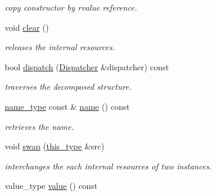 \begin{DoxyCompactItemize}
\begin{DoxyCompactList}\small\item\em copy constructor by rvalue reference. \end{DoxyCompactList}\item 
\hypertarget{classhryky_1_1reduction_1_1_bool_ac5ecbeeaf7a08b030db1465f3d101f25}{void \hyperlink{classhryky_1_1reduction_1_1_bool_ac5ecbeeaf7a08b030db1465f3d101f25}{clear} ()}\label{classhryky_1_1reduction_1_1_bool_ac5ecbeeaf7a08b030db1465f3d101f25}

\begin{DoxyCompactList}\small\item\em releases the internal resources. \end{DoxyCompactList}\item 
bool \hyperlink{classhryky_1_1reduction_1_1_base_a71b31d4d0ed915254e2cb1ef217f28c4}{dispatch} (\hyperlink{classhryky_1_1reduction_1_1_dispatcher}{Dispatcher} \&dispatcher) const 
\begin{DoxyCompactList}\small\item\em traverses the decomposed structure. \end{DoxyCompactList}\item 
\hypertarget{classhryky_1_1reduction_1_1_base_a842569265d741905eb8a353d3935f1d1}{\hyperlink{namespacehryky_1_1reduction_ac686c30a4c8d196bbd0f05629a6b921f}{name\-\_\-type} const \& \hyperlink{classhryky_1_1reduction_1_1_base_a842569265d741905eb8a353d3935f1d1}{name} () const }\label{classhryky_1_1reduction_1_1_base_a842569265d741905eb8a353d3935f1d1}

\begin{DoxyCompactList}\small\item\em retrieves the name. \end{DoxyCompactList}\item 
\hypertarget{classhryky_1_1reduction_1_1_bool_a9f6be2c70cd57b9b5b49f97876253731}{void \hyperlink{classhryky_1_1reduction_1_1_bool_a9f6be2c70cd57b9b5b49f97876253731}{swap} (\hyperlink{classhryky_1_1reduction_1_1_base_af02a7dee6042080b7380afd2f9500a42}{this\-\_\-type} \&src)}\label{classhryky_1_1reduction_1_1_bool_a9f6be2c70cd57b9b5b49f97876253731}

\begin{DoxyCompactList}\small\item\em interchanges the each internal resources of two instances. \end{DoxyCompactList}\item 
\hypertarget{classhryky_1_1reduction_1_1_bool_adc9dc3d2690f737eace344341033c6ce}{value\-\_\-type \hyperlink{classhryky_1_1reduction_1_1_bool_adc9dc3d2690f737eace344341033c6ce}{value} () const }\label{classhryky_1_1reduction_1_1_bool_adc9dc3d2690f737eace344341033c6ce}


\end{DoxyCompactItemize}

